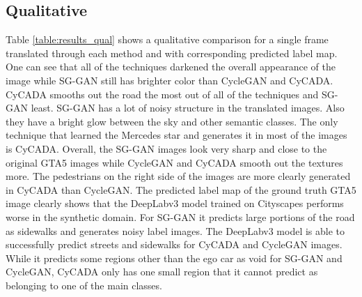 \subsection{Qualitative}
Table \ref{table:results_qual} shows a qualitative comparison for a single frame translated through each method and with corresponding predicted label map. One can see that all of the techniques darkened the overall appearance of the image while SG-GAN still has brighter color than CycleGAN and CyCADA. CyCADA smooths out the road the most out of all of the techniques and SG-GAN least. SG-GAN has a lot of noisy structure in the translated images. Also they have a bright glow between the sky and other semantic classes. The only technique that learned the Mercedes star and generates it in most of the images is CyCADA. Overall, the SG-GAN images look very sharp and close to the original GTA5 images while CycleGAN and CyCADA smooth out the textures more. The pedestrians on the right side of the images are more clearly generated in CyCADA than CycleGAN. The predicted label map of the ground truth GTA5 image clearly shows that the DeepLabv3 model trained on Cityscapes performs worse in the synthetic domain. For SG-GAN it predicts large portions of the road as sidewalks and generates noisy label images. The DeepLabv3 model is able to successfully predict streets and sidewalks for CyCADA and CycleGAN images. While it predicts some regions other than the ego car as void for SG-GAN and CycleGAN, CyCADA only has one small region that it cannot predict as belonging to one of the main classes.







